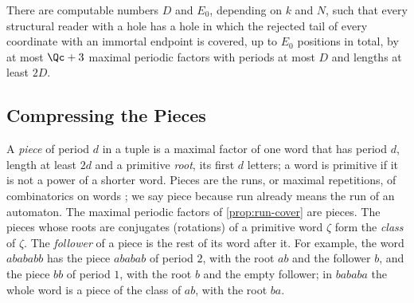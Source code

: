 \begin{proposition}\label{prop:run-cover}
There are computable numbers $D$ and $E_0$, depending on $k$ and $N$, such
that every structural reader with a hole has a hole in which the rejected
tail of every coordinate with an immortal endpoint is covered, up to $E_0$
positions in total, by at most $\Qc+3$ maximal periodic factors with periods
at most $D$ and lengths at least $2D$.
\end{proposition}

\subsection{Compressing the Pieces}\label{sec:tails-compression}

A \emph{piece} of period $d$ in a tuple is a maximal factor of one word that
has period $d$, length at least $2d$ and a primitive \emph{root}, its first
$d$ letters; a word is primitive if it is not a power of a shorter word.
Pieces are the runs, or maximal repetitions, of combinatorics on words
\cite{KolpakovKucherov99}; we say piece because run already means the run of
an automaton. The maximal periodic factors of \cref{prop:run-cover} are
pieces. The pieces whose roots are conjugates (rotations) of a primitive
word $\zeta$ form the \emph{class} of $\zeta$. The \emph{follower} of a
piece is the rest of its word after it. For example, the word $abababb$ has
the piece $ababab$ of period $2$, with the root $ab$ and the follower $b$,
and the piece $bb$ of period $1$, with the root $b$ and the empty follower;
in $bababa$ the whole word is a piece of the class of $ab$, with the root
$ba$.



